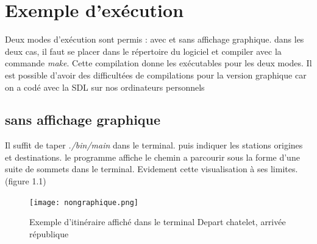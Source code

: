 \documentclass[12pt]{report}
\begin{document}
\section{Exemple d'exécution}

Deux modes d'exécution sont permis : avec et sans affichage graphique. dans les deux cas, il faut se placer dans le répertoire du logiciel et compiler avec la commande \emph{make}. Cette compilation donne les exécutables pour les deux modes.
\newline Il est possible d'avoir des difficultées de compilations pour la version graphique car on a codé avec la SDL sur nos ordinateurs personnels


\subsection{sans affichage graphique}
Il suffit de taper \emph{./bin/main} dans le terminal. puis indiquer les stations origines et destinations. le programme affiche le chemin a parcourir sous la forme d'une suite de sommets dans le terminal. Evidement cette visualisation à ses limites. (figure 1.1)
\newline
\begin{figure}
  \centering
    \texttt{[image: nongraphique.png]}
    \caption{Exemple d'itinéraire affiché dans le terminal Depart chatelet, arrivée république}
\end{figure}
\end{document}

